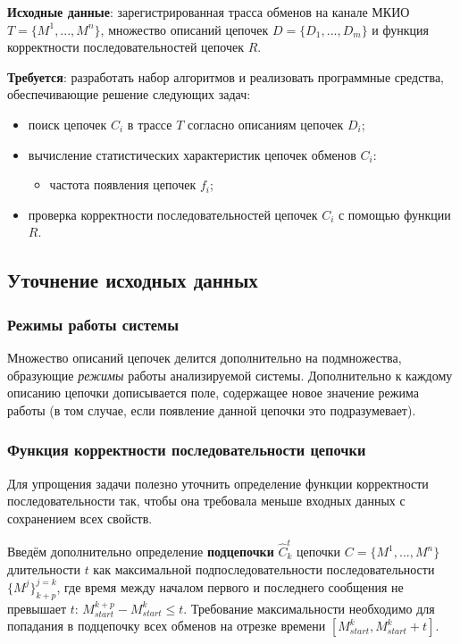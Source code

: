 \textbf{Исходные данные}: зарегистрированная трасса обменов на канале МКИО $T = 
\{ M^1, ..., M^n \}$, множество описаний цепочек $D = \{ D_1, ..., D_m \}$ и 
функция корректности последовательностей цепочек $R$.

\textbf{Требуется}: разработать набор алгоритмов и реализовать программные 
средства, обеспечивающие решение следующих задач:

\begin{itemize}
 \item поиск цепочек $C_i$ в трассе $T$ согласно 
описаниям цепочек $D_i$;
 \item вычисление статистических характеристик цепочек обменов $C_i$:
 \begin{itemize}
  \item частота появления цепочек $f_i$;
 \end{itemize}
 \item проверка корректности последовательностей цепочек $C_i$ с помощью 
функции $R$.

\end{itemize}

\subsection{Уточнение исходных данных}

\subsubsection{Режимы работы системы}

Множество описаний цепочек делится дополнительно на подмножества, образующие 
\textit{режимы} работы анализируемой системы. Дополнительно к каждому описанию 
цепочки дописывается поле, содержащее новое значение режима работы (в том 
случае, если появление данной цепочки это подразумевает).

\subsubsection{Функция корректности последовательности цепочки}

Для упрощения задачи полезно уточнить определение функции корректности 
последовательности так, чтобы она требовала меньше входных данных с сохранением 
всех свойств.

Введём дополнительно определение \textbf{подцепочки} $\hat{C}^t_k$ цепочки $C = 
\{M^1, ..., M^n\}$ длительности $t$ как максимальной подпоследовательности 
последовательности $\{M^j\}^{j=k}_{k+p}$, где время между началом первого и 
последнего сообщения не превышает $t$: $M^{k+p}_{start} - M^k_{start} \leq t$. 
Требование максимальности необходимо для попадания в подцепочку всех обменов на 
отрезке времени $[M^k_{start}, M^k_{start}+ t]$.


